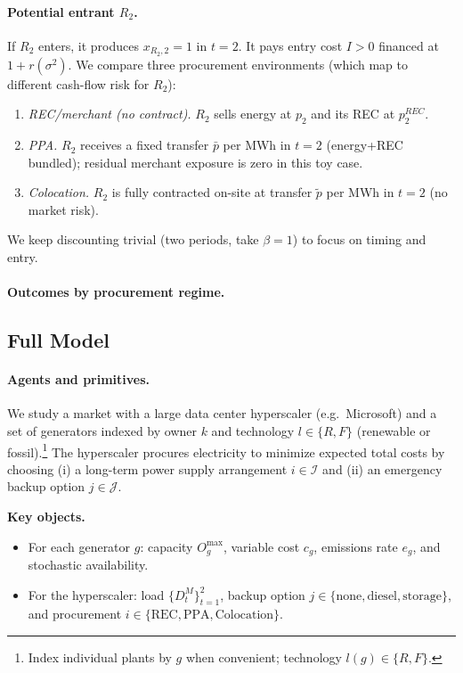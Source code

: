 \documentclass[a4paper,fleqn,longmktitle]{cas-sc}
\begin{document}
\paragraph{Potential entrant $R_2$.}
If $R_2$ enters, it produces $x_{R_2,2}=1$ in $t=2$. It pays entry cost $I>0$ financed at $1+r(\sigma^2)$.
We compare three procurement environments (which map to different cash-flow risk for $R_2$):
\begin{enumerate}
\item \emph{REC/merchant (no contract).} $R_2$ sells energy at $p_2$ and its REC at $p^{REC}_2$.
\item \emph{PPA.} $R_2$ receives a fixed transfer $\bar p$ per MWh in $t=2$ (energy+REC bundled); residual merchant exposure is zero in this toy case.
\item \emph{Colocation.} $R_2$ is fully contracted on-site at transfer $\tilde p$ per MWh in $t=2$ (no market risk).
\end{enumerate}
We keep discounting trivial (two periods, take $\beta=1$) to focus on timing and entry.

\paragraph{Outcomes by procurement regime.}
\subsection{Full Model}

\paragraph{Agents and primitives.}
We study a market with a large data center hyperscaler (e.g.\ Microsoft) and a set of generators indexed by owner $k$ and technology $l \in \{R,F\}$ (renewable or fossil).\footnote{Index individual plants by $g$ when convenient; technology $l(g)\in\{R,F\}$.} 
The hyperscaler procures electricity to minimize expected total costs by choosing (i) a long-term power supply arrangement $i\in\mathcal I$ and (ii) an emergency backup option $j\in\mathcal J$.

\vspace{0.5em}
\noindent\textbf{Key objects.} 
\begin{itemize}
\item For each generator $g$: capacity $O^{\max}_g$, variable cost $c_g$, emissions rate $e_g$, and stochastic availability.
\item For the hyperscaler: load $\{D^M_t\}_{t=1}^2$, backup option $j\in\{\text{none},\text{diesel},\text{storage}\}$, and procurement $i\in\{\text{REC}, \text{PPA}, \text{Colocation}\}$.
\end{itemize}
\end{document}
